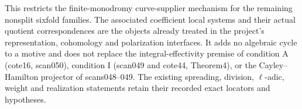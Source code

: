 This restricts the finite-monodromy curve-supplier mechanism for the
remaining nonsplit sixfold families. The associated coefficient local
systems and their actual quotient correspondences are the objects
already treated in the project's representation, cohomology and
polarization interfaces. It adds no algebraic cycle to a motive and
does not replace the integral-effectivity premise of condition A
(cote16, scan050), condition I (scan049 and cote44, Theorem4), or the
Cayley--Hamilton projector of scans048--049. The existing spreading,
division, \(\ell\)-adic, weight and realization statements retain
their recorded exact locators and hypotheses.
